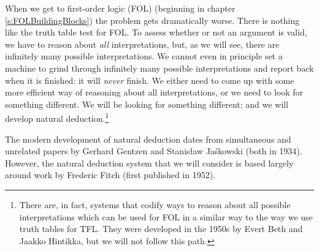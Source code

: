 When we get to first-order logic (FOL) (beginning in chapter \ref{s:FOLBuildingBlocks}) the problem gets dramatically worse. There is nothing like the truth table test for FOL. To assess whether or not an argument is valid, we have to reason about \emph{all} interpretations, but, as we will see, there are infinitely many possible interpretations. We cannot even in principle set a machine to grind through infinitely many possible interpretations and report back when it is finished: it will \emph{never} finish. We either need to come up with some more efficient way of reasoning about all interpretations, or we need to look for something different. We will be looking for something different; and we will develop natural deduction.\footnote{There are, in fact, systems that codify ways to reason about all possible interpretations which can be used for FOL in a similar way to the way we use truth tables for TFL. They were developed in the 1950s by Evert Beth and Jaakko Hintikka, but we will not follow this path.} 
%
%
%



The modern development of natural deduction dates from simultaneous and unrelated papers by Gerhard Gentzen and Stanis\l{}aw Ja\'{s}kowski (both in 1934). However, the natural deduction system that we will consider is based largely around work by Frederic Fitch (first published in 1952). 



